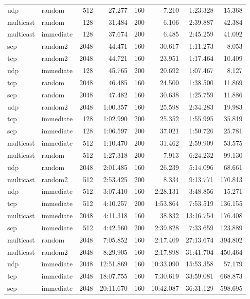 \begin{tabular}{|l|l|r|r|r|r|r|r|}
udp & random & 512 & 27.277 & 160 & 7.210 & 1:23.328 & 15.368\\
multicast & random & 128 & 31.484 & 200 & 6.106 & 2:39.887 & 42.384\\
multicast & immediate & 128 & 37.674 & 200 & 6.485 & 2:45.259 & 41.092\\
scp & random2 & 2048 & 44.471 & 160 & 30.617 & 1:11.273 & 8.053\\
tcp & random2 & 2048 & 44.721 & 160 & 23.951 & 1:17.464 & 10.409\\
udp & immediate & 128 & 45.765 & 200 & 20.692 & 1:07.467 & 8.127\\
tcp & random & 2048 & 46.485 & 160 & 24.500 & 1:38.500 & 11.869\\
scp & random & 2048 & 47.482 & 160 & 30.638 & 1:25.759 & 11.886\\
udp & random2 & 2048 & 1:00.357 & 160 & 25.598 & 2:34.283 & 19.983\\
tcp & immediate & 128 & 1:02.990 & 200 & 25.352 & 1:55.995 & 35.819\\
scp & immediate & 128 & 1:06.597 & 200 & 37.021 & 1:50.726 & 25.781\\
multicast & immediate & 512 & 1:10.470 & 200 & 31.462 & 2:59.909 & 53.575\\
multicast & random & 512 & 1:27.318 & 200 & 7.913 & 6:24.232 & 99.130\\
udp & random & 2048 & 2:01.485 & 160 & 26.239 & 5:14.096 & 68.661\\
multicast & random2 & 512 & 2:53.425 & 200 & 8.334 & 9:13.771 & 170.813\\
udp & immediate & 512 & 3:07.410 & 160 & 2:28.131 & 3:48.856 & 15.271\\
tcp & immediate & 512 & 4:10.257 & 200 & 1:53.864 & 7:53.519 & 136.155\\
multicast & immediate & 2048 & 4:11.318 & 160 & 38.832 & 13:16.754 & 176.408\\
scp & immediate & 512 & 4:42.560 & 200 & 2:39.828 & 7:33.659 & 123.889\\
multicast & random & 2048 & 7:05.852 & 160 & 2:17.409 & 27:13.674 & 394.802\\
multicast & random2 & 2048 & 8:29.905 & 160 & 2:17.898 & 31:41.704 & 450.464\\
udp & immediate & 2048 & 12:51.869 & 160 & 10:33.090 & 15:53.358 & 57.179\\
tcp & immediate & 2048 & 18:07.755 & 160 & 7:30.619 & 33:59.081 & 668.873\\
scp & immediate & 2048 & 20:11.670 & 160 & 10:42.087 & 36:31.129 & 598.695\\
\hline
\end{tabular}
